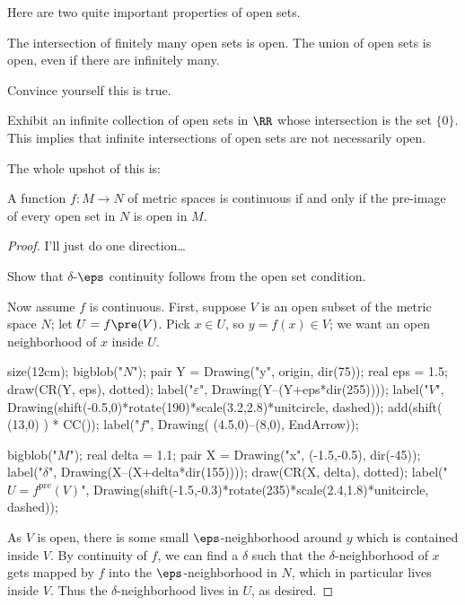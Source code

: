 Here are two quite important properties of open sets.
\begin{proposition}
	\listhack
	\begin{enumerate}[(a)]
		\ii The intersection of finitely many open sets is open.
		\ii The union of open sets is open, even if there are infinitely many.
	\end{enumerate}
\end{proposition}
\begin{ques}
	Convince yourself this is true.
\end{ques}
\begin{exercise}
	Exhibit an infinite collection of open sets in $\RR$
	whose intersection is the set $\{0\}$.
	This implies that infinite intersections of open sets are not necessarily open.
\end{exercise}

The whole upshot of this is:
\begin{theorem}
	\label{thm:open_set}
	A function $f \colon M \to N$ of metric spaces is continuous
	if and only if the pre-image of every open set in $N$ is open in $M$.
\end{theorem}
\begin{proof}
	I'll just do one direction\dots
	\begin{exercise}
		Show that $\delta$-$\eps$ continuity follows from
		the open set condition.
	\end{exercise}
	Now assume $f$ is continuous.
	First, suppose $V$ is an open subset of the metric space $N$;
	let $U = f\pre(V)$. Pick $x \in U$, so $y = f(x) \in V$; we want an
	open neighborhood of $x$ inside $U$.

	\begin{center}
		\begin{asy}
			size(12cm);
			bigblob("$N$");
			pair Y = Drawing("y", origin, dir(75));
			real eps = 1.5;
			draw(CR(Y, eps), dotted);
			label("$\varepsilon$", Drawing(Y--(Y+eps*dir(255))));
			label("$V$",
				Drawing(shift(-0.5,0)*rotate(190)*scale(3.2,2.8)*unitcircle, dashed));
			add(shift( (13,0) ) * CC());
			label("$f$", Drawing( (4.5,0)--(8,0), EndArrow));

			bigblob("$M$");
			real delta = 1.1;
			pair X = Drawing("x", (-1.5,-0.5), dir(-45));
			label("$\delta$", Drawing(X--(X+delta*dir(155))));
			draw(CR(X, delta), dotted);
			label("$U = f^{\text{pre}}(V)$",
				Drawing(shift(-1.5,-0.3)*rotate(235)*scale(2.4,1.8)*unitcircle, dashed));
		\end{asy}
	\end{center}

	As $V$ is open, there is some small $\eps$-neighborhood around $y$
	which is contained inside $V$.
	By continuity of $f$, we can find a $\delta$ such that the $\delta$-neighborhood
	of $x$ gets mapped by $f$ into the $\eps$-neighborhood in $N$,
	which in particular lives inside $V$.
	Thus the $\delta$-neighborhood lives in $U$, as desired.
\end{proof}

